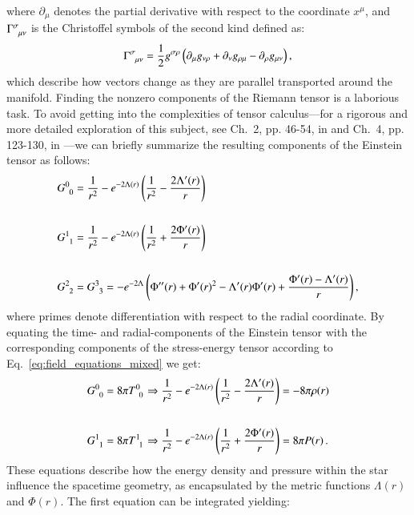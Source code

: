 \documentclass[main.tex]{subfiles}
\begin{document}
     where $\partial_\mu$ denotes the partial derivative with respect to the coordinate $x^\mu$, and $\Gamma\indices{^\sigma_{\mu\nu}}$ is the Christoffel symbols of the second kind defined as:
     \begin{equation}
         \Gamma\indices{^\sigma_{\mu\nu}} = \frac{1}{2}g^{\sigma \rho}\left(\partial_\mu g_{\nu\rho} + \partial_\nu g_{\rho\mu} - \partial_\rho g_{\mu\nu}\right),
     \end{equation}
     which describe how vectors change as they are parallel transported around the manifold.
     Finding the nonzero components of the Riemann tensor is a laborious task. To avoid getting into the complexities of tensor calculus---for a rigorous and more detailed exploration of this subject, see Ch.~2, pp. 46-54, in \cite{1996cost.book.....G} and Ch.~4, pp. 123-130, in \cite{2007coaw.book.....C}---we can briefly summarize the resulting components of the Einstein tensor as follows:
     \begin{align}
         G\indices{^0_0} &= \frac{1}{r^2} - e^{-2\Lambda(r)}\left(\frac{1}{r^2} - \frac{2\Lambda^\prime(r)}{r}\right) \\\nonumber\\
         G\indices{^1_1} &= \frac{1}{r^2} - e^{-2\Lambda(r)}\left(\frac{1}{r^2} + \frac{2\Phi^\prime(r)}{r}\right) \\\nonumber\\
         G\indices{^2_2} &= G\indices{^3_3} = -e^{-2\Lambda}\left( \Phi^{\prime\prime}(r) + \Phi^\prime(r)^2 - \Lambda^\prime(r) \Phi^\prime(r) + \frac{\Phi^\prime(r) - \Lambda^\prime(r)}{r} \right),
     \end{align}
     where primes denote differentiation with respect to the radial coordinate. By equating the time- and radial-components of the Einstein tensor with the corresponding components of the stress-energy tensor according to Eq.~\eqref{eq:field_equations_mixed} we get:
     \begin{align}
         G\indices{^0_0} &= 8\pi T\indices{^0_0} \Rightarrow \frac{1}{r^2} - e^{-2\Lambda(r)}\left(\frac{1}{r^2} - \frac{2\Lambda^\prime(r)}{r}\right) = - 8 \pi \rho(r) \\\nonumber \\
         G\indices{^1_1} &= 8\pi T\indices{^1_1} \Rightarrow\frac{1}{r^2} - e^{-2\Lambda(r)}\left(\frac{1}{r^2} + \frac{2\Phi^\prime(r)}{r}\right) = 8 \pi P(r)\,.
     \end{align}
     These equations describe how the energy density and pressure within the star influence the spacetime geometry, as encapsulated by the metric functions $\Lambda(r)$ and $\Phi(r)$. The first equation can be integrated yielding:
\end{document}
